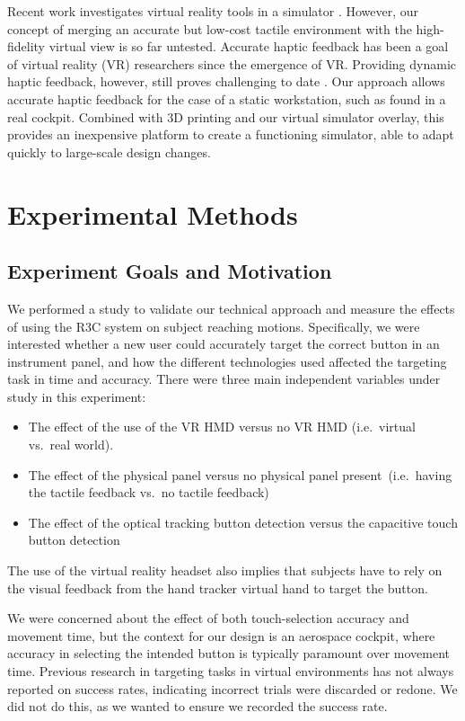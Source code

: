 Recent work investigates virtual reality tools in a simulator \citep{wan_mrstudio:_2011, yavrucuk_low_2011, aslandere_virtual_2015}.
However, our concept of merging an accurate but low-cost tactile environment with the high-fidelity virtual view is so far untested.
Accurate haptic feedback has been a goal of virtual reality (VR) researchers since the emergence of VR.
Providing dynamic haptic feedback, however, still proves challenging to date \citep{stone_haptic_2001,lecuyer_simulating_2009}.
Our approach allows accurate haptic feedback for the case of a static workstation, such as found in a real cockpit.
Combined with 3D printing and our virtual simulator overlay, this provides an in\-expensive platform to create a functioning simulator, able to adapt quickly to large-scale design changes.

\section{Experimental Methods}

\subsection{Experiment Goals and Motivation}

We performed a study to validate our technical approach and measure the effects of using the R3C system on subject reaching motions.
Specifically, we were interested whether a new user could accurately target the correct button in an instrument panel, and how the different technologies used affected the targeting task in time and accuracy.
There were three main independent variables under study in this experiment:
\begin{itemize}
    \item The effect of the use of the VR HMD versus no VR HMD (i.e.\ virtual vs.\ real world).
    \item The effect of the physical panel versus no physical panel present\ (i.e.\ having the tactile feedback vs.\ no tactile feedback)
    \item The effect of the optical tracking button detection versus the capacitive touch button detection
\end{itemize}
The use of the virtual reality headset also implies that subjects have to rely on the visual feedback from the hand tracker virtual hand to target the button.

We were concerned about the effect of both touch-selection accuracy and movement time, but the context for our design is an aerospace cockpit, where accuracy in selecting the intended button is typically paramount over movement time.
Previous research in targeting tasks in virtual environments has not always reported on success rates, indicating incorrect trials were discarded or redone.
We did not do this, as we wanted to ensure we recorded the success rate.

